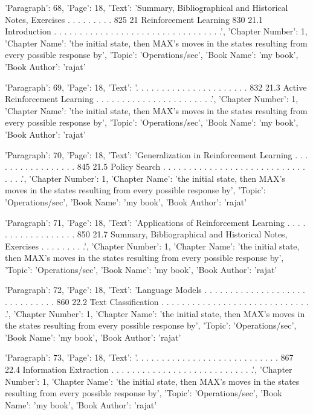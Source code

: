 {'Paragraph': 68, 'Page': 18, 'Text': 'Summary, Bibliographical and Historical Notes, Exercises . . . . . . . . . 825 21 Reinforcement Learning 830 21.1 Introduction . . . . . . . . . . . . . . . . . . . . . . . . . . . . . . . . .', 'Chapter Number': 1, 'Chapter Name': 'the initial state, then MAX’s moves in the states resulting from every possible response by', 'Topic': 'Operations/sec', 'Book Name': 'my book', 'Book Author': 'rajat'}

{'Paragraph': 69, 'Page': 18, 'Text': '. . . . . . . . . . . . . . . . . . . . . . 832 21.3 Active Reinforcement Learning . . . . . . . . . . . . . . . . . . . . . . .', 'Chapter Number': 1, 'Chapter Name': 'the initial state, then MAX’s moves in the states resulting from every possible response by', 'Topic': 'Operations/sec', 'Book Name': 'my book', 'Book Author': 'rajat'}

{'Paragraph': 70, 'Page': 18, 'Text': 'Generalization in Reinforcement Learning . . . . . . . . . . . . . . . . . 845 21.5 Policy Search . . . . . . . . . . . . . . . . . . . . . . . . . . . . . . . .', 'Chapter Number': 1, 'Chapter Name': 'the initial state, then MAX’s moves in the states resulting from every possible response by', 'Topic': 'Operations/sec', 'Book Name': 'my book', 'Book Author': 'rajat'}

{'Paragraph': 71, 'Page': 18, 'Text': 'Applications of Reinforcement Learning . . . . . . . . . . . . . . . . . . 850 21.7 Summary, Bibliographical and Historical Notes, Exercises . . . . . . . . .', 'Chapter Number': 1, 'Chapter Name': 'the initial state, then MAX’s moves in the states resulting from every possible response by', 'Topic': 'Operations/sec', 'Book Name': 'my book', 'Book Author': 'rajat'}

{'Paragraph': 72, 'Page': 18, 'Text': 'Language Models . . . . . . . . . . . . . . . . . . . . . . . . . . . . . . 860 22.2 Text Classiﬁcation . . . . . . . . . . . . . . . . . . . . . . . . . . . . . .', 'Chapter Number': 1, 'Chapter Name': 'the initial state, then MAX’s moves in the states resulting from every possible response by', 'Topic': 'Operations/sec', 'Book Name': 'my book', 'Book Author': 'rajat'}

{'Paragraph': 73, 'Page': 18, 'Text': '. . . . . . . . . . . . . . . . . . . . . . . . . . . . 867 22.4 Information Extraction . . . . . . . . . . . . . . . . . . . . . . . . . . . .', 'Chapter Number': 1, 'Chapter Name': 'the initial state, then MAX’s moves in the states resulting from every possible response by', 'Topic': 'Operations/sec', 'Book Name': 'my book', 'Book Author': 'rajat'}

